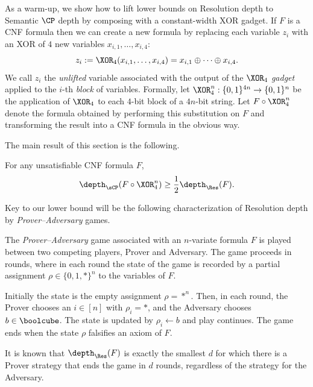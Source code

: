 \documentclass{toc}
\begin{document}
As a warm-up, we show how to lift lower bounds on Resolution depth to Semantic $\CP$ depth by composing with a constant-width XOR gadget.
If $F$ is a CNF formula then we can create a new formula by replacing each variable $z_i$ with an XOR of $4$ new variables $x_{i,1},\ldots, x_{i,4}$:
\[z_i := \XOR_4(x_{i,1},\ldots, x_{i,4}) = x_{i,1} \oplus \cdots \oplus x_{i,4}. \] 
We call $z_i$ the \emph{unlifted} variable associated with the output of the $\XOR_4$ \emph{gadget} applied to the $i$-th \emph{block} of variables. 
Formally, let $\XOR_4^n:\{0,1\}^{4n} \rightarrow \{0,1\}^n$ be the application of $\XOR_4$ to each $4$-bit block of a $4n$-bit string. 
Let $F \circ \XOR_4^n$ denote the formula obtained by performing this substitution on $F$ and transforming the result into a CNF formula in the obvious way.

The main result of this section is the following.
\begin{theorem}\label{thm:cp-depth-lifting}
	For any unsatisfiable CNF formula $F$, \[\depth_{\sCP}(F\circ \XOR_4^n) \geq \frac{1}{2} \depth_{\Res}(F).\]
\end{theorem}

Key to our lower bound will be the following characterization of Resolution depth by \emph{Prover--Adversary} games.

\begin{definition}\label{def:prover-adversary}
	The \emph{Prover--Adversary} game associated with an $n$-variate formula $F$ is played between two competing players, Prover and Adversary. 
	The game proceeds in rounds, where in each round the state of the game is recorded by a partial assignment $\rho\in\{0,1,*\}^n$ to the variables of $F$. 

	Initially the state is the empty assignment $\rho=*^n$. 
	Then, in each round, the Prover chooses an $i \in [n]$ with $\rho_i = *$, and the Adversary chooses $b \in \boolcube$.
	The state is updated by $\rho_i \leftarrow b$ and play continues.
	The game ends when the state $\rho$ falsifies an axiom of $F$. 

	It is known \cite{Pudlak00} that $\depth_{\Res}(F)$ is exactly the smallest $d$ for which there is a Prover strategy that ends the game in $d$ rounds, regardless of the strategy for the Adversary.
\end{definition}
\end{document}
